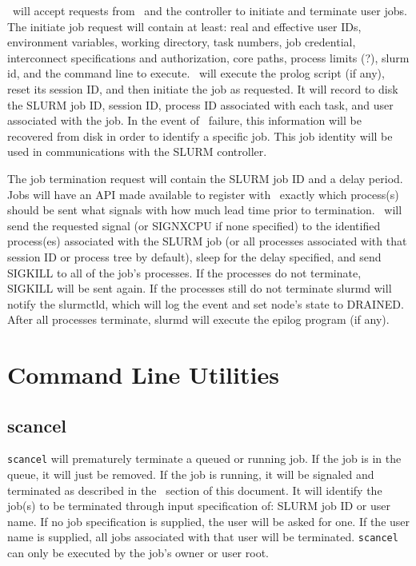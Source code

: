 \slurmd\ will accept requests from \srun\ and the controller to initiate
and terminate user jobs. The initiate job request will contain at least: 
real and effective user IDs, environment variables, working directory, task
numbers, job credential, interconnect specifications and authorization,
core paths, process limits (?), slurm id, and the command line to execute. 
\slurmd\ will execute the prolog script (if any), reset its
session ID, and then initiate the job as requested. It will record to
disk the SLURM job ID, session ID, process ID associated with each task,
and user associated with the job.  In the event of \slurmd\ failure,
this information will be recovered from disk in order to identify a
specific job. This  job identity will be used in communications with
the SLURM controller.


The job termination request will contain the SLURM job ID and a delay
period.  Jobs will have an API made available to register with \slurmd\
exactly which process(s) should be sent what signals with how much lead
time prior to termination.  \slurmd\ will send the requested signal (or
SIGNXCPU if none specified) to the identified process(es) associated with
the SLURM job (or all processes associated with that session ID or process
tree by default), sleep for the delay specified, and send SIGKILL to all
of the job's processes.  If the processes do not terminate, SIGKILL will
be sent again.  If the processes still do not terminate slurmd will notify
the slurmctld, which will log the event and set node's state to DRAINED.
After all processes terminate, slurmd will execute the epilog program
(if any).

\section{Command Line Utilities}

\subsection{scancel}

{\tt scancel} will prematurely terminate a queued or running job.
If the job is in the queue, it will just be removed.  If the job is
running, it will be signaled and terminated as described in the \slurmd\
section of this document.  It will identify the job(s) to be terminated
through input specification of: SLURM job ID or user name.  If no job
specification is supplied, the user will be asked for one.  If the user
name is supplied, all jobs associated with that user will be terminated.
{\tt scancel} can only be executed by the job's owner or user root.

